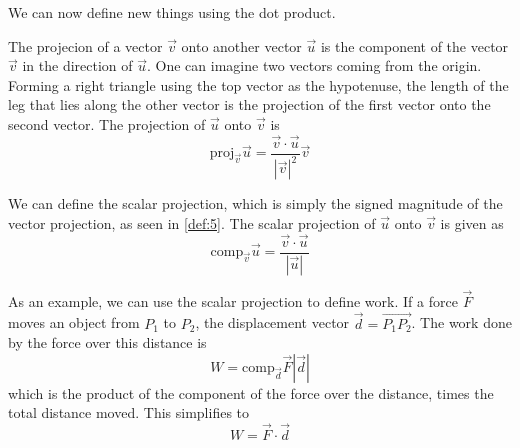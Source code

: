 We can now define new things using the dot product.
\begin{definition}\label{def:5}
	The projecion of a vector $\vec{v}$ onto another vector $\vec{u}$ is the component of the vector $\vec{v}$ in the direction of $\vec{u}$. One can imagine two vectors coming from the origin. Forming a right triangle using the top vector as the hypotenuse, the length of the leg that lies along the other vector is the projection of the first vector onto the second vector. The projection of $\vec{u}$ onto $\vec{v}$ is
	$$\text{proj}_{\vec{v}}\vec{u}=\frac{\vec{v}\cdot\vec{u}}{|\vec{v}|^2}\vec{v}$$
\end{definition}
\begin{definition}\label{def:6}
	We can define the scalar projection, which is simply the signed magnitude of the vector projection, as seen in \ref{def:5}. The scalar projection of $\vec{u}$ onto $\vec{v}$ is given as
	$$\text{comp}_{\vec{v}}\vec{u}=\frac{\vec{v}\cdot\vec{u}}{|\vec{u}|}$$
\end{definition}
As an example, we can use the scalar projection to define work. If a force $\vec{F}$ moves an object from $P_1$ to $P_2$, the displacement vector $\vec{d}=\overrightarrow{P_1P_2}$. The work done by the force over this distance is
$$W=\text{comp}_{\vec{d}}\vec{F}|\vec{d}|$$
which is the product of the component of the force over the distance, times the total distance moved. This simplifies to
$$W=\vec{F}\cdot\vec{d}$$